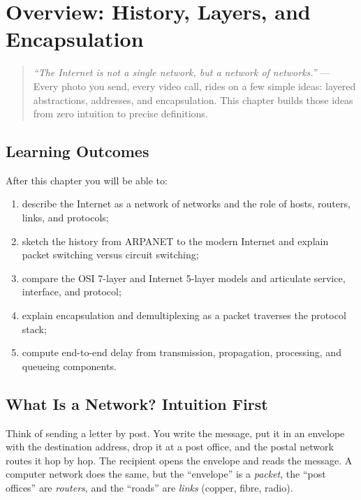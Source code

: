 \chapter{Overview: History, Layers, and Encapsulation}
\label{ch:overview}

\begin{quote}
\emph{``The Internet is not a single network, but a network of networks.''} --- Every photo you send, every video call, rides on a few simple ideas: layered abstractions, addresses, and encapsulation. This chapter builds those ideas from zero intuition to precise definitions.
\end{quote}

\noindent{}

\section*{Learning Outcomes}
After this chapter you will be able to:
\begin{enumerate}[label=(L\arabic*)]
    \item describe the Internet as a network of networks and the role of hosts, routers, links, and protocols;
    \item sketch the history from ARPANET to the modern Internet and explain packet switching versus circuit switching;
    \item compare the OSI 7-layer and Internet 5-layer models and articulate service, interface, and protocol;
    \item explain encapsulation and demultiplexing as a packet traverses the protocol stack;
    \item compute end-to-end delay from transmission, propagation, processing, and queueing components.
\end{enumerate}

\section{What Is a Network? Intuition First}
\label{sec:what-is-network}
Think of sending a letter by post. You write the message, put it in an envelope with the destination address, drop it at a post office, and the postal network routes it hop by hop. The recipient opens the envelope and reads the message. A computer network does the same, but the ``envelope'' is a \emph{packet}, the ``post offices'' are \emph{routers}, and the ``roads'' are \emph{links} (copper, fibre, radio).

